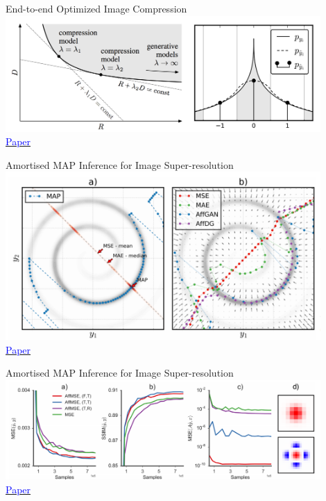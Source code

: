 \documentclass[]{beamer}
\begin{document}
\begin{frame}{End-to-end Optimized Image Compression}
\centering
\includegraphics[width=0.9\textwidth]{figures/balle-tradeoff} \\
\href{https://openreview.net/forum?id=rJxdQ3jeg}{\textcolor{blue}{Paper}}
\end{frame}

\begin{frame}{Amortised MAP Inference for Image Super-resolution}
\centering
\includegraphics[width=0.9\textwidth]{figures/sonderby-swiss-roll} \\
\href{https://openreview.net/forum?id=S1RP6GLle}{\textcolor{blue}{Paper}}
\end{frame}

\begin{frame}{Amortised MAP Inference for Image Super-resolution}
\centering
\includegraphics[width=0.9\textwidth]{figures/sonderby-celeba} \\
\href{https://openreview.net/forum?id=S1RP6GLle}{\textcolor{blue}{Paper}}
\end{frame}
\end{document}
